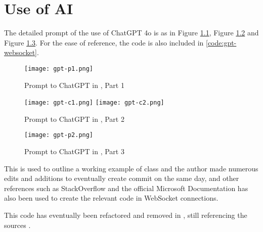 \chapter{Use of AI}
The detailed prompt of the use of ChatGPT 4o \autocite{gpt-websocket} is as in Figure \ref{fig:gpt-websocket-1}, Figure \ref{fig:gpt-websocket-2} and Figure \ref{fig:gpt-websocket-3}. For the ease of reference, the code is also included in \ref{code:gpt-websocket}.

\begin{figure}[htp]
    \centering

    \texttt{[image: gpt-p1.png]}
    \caption[Prompt to ChatGPT in \autocite{gpt-websocket}, Part 1]{Prompt to ChatGPT in \autocite{gpt-websocket}, Part 1}
    \label{fig:gpt-websocket-1}
\end{figure}

\begin{figure}[htp]
    \centering

    \texttt{[image: gpt-c1.png]}
    \texttt{[image: gpt-c2.png]}

    \caption[Prompt to ChatGPT in \autocite{gpt-websocket}, Part 2]{Prompt to ChatGPT in \autocite{gpt-websocket}, Part 2}
    \label{fig:gpt-websocket-2}
\end{figure}

\begin{figure}[htp]
    \centering

    \texttt{[image: gpt-p2.png]}

    \caption[Prompt to ChatGPT in \autocite{gpt-websocket}, Part 3]{Prompt to ChatGPT in \autocite{gpt-websocket}, Part 3}
    \label{fig:gpt-websocket-3}
\end{figure}

This is used to outline a working example of  class and the author made numerous edits and additions to eventually create commit  on the same day, and other references such as StackOverflow \autocite{stackoverflow-websocket-demo, stackoverflow-websocket-demo-2} and the official Microsoft Documentation \autocite{dotnet-reference-clientwebsocket} has also been used to create the relevant code in WebSocket connections.

This code has eventually been refactored and removed in , still referencing the sources \autocite{stackoverflow-websocket-demo, stackoverflow-websocket-demo-2}.
